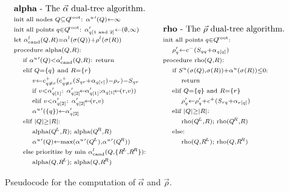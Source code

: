 \documentclass{article}
\newcommand{\kdroot}[1]{#1^{\!\text{\rm root}}}
\newcommand{\kdleft}[1]{#1^{\!L}}
\newcommand{\kdright}[1]{#1^{\!R}}
\newcommand{\X}{\\ \scriptstyle}
\newcommand{\x}{\\ \hspace{0.15in} \scriptstyle}
\newcommand{\xx}{\\ \hspace{0.3in} \scriptstyle}
\newcommand{\ocpos}[1]{c^{+}_{#1}}
\newcommand{\cpos}[2]{\ocpos{#1 \neq #2}}
\newcommand{\simil}[2]{S_{#1#2}}
\newcommand{\vecrho}{\vec{\rho}}
\newcommand{\vecalpha}{\vec{\alpha}}
\newcommand{\frho}[1]{\rho_{#1}}
\newcommand{\falphaj}[2]{\alpha_{#1[#2]}}
\newcommand{\falphamax}{\alpha^{u}}
\newcommand{\falphamin}{\alpha^{l}}
\newcommand{\frhomin}{\rho^{l}}
\newcommand{\alphacand}{v}
\begin{document}
\begin{figure}
  \begin{equation*}
    \begin{array}{ll}
      \begin{array}{l}
        \text{{\bf alpha} - The }\vecalpha\text{ dual-tree algorithm.}
        \X \text{init all nodes }Q \subseteq \kdroot{Q}\text{: }\falphamax{'}(Q) \gets \infty
        \X \text{init all points }q \in \kdroot{Q}\text{: }\falphaj{q}{1\text{ and }2}' \gets (\emptyset, \infty)
        \X \text{let }\falphamin_{\text{cand}}(Q, R) = \falphamin(\sigma(Q)) + \frhomin(\sigma(R))
        \X \text{procedure alpha}(Q,R)\text{:}
        \x \text{if }\falphamax{'}(Q) < \falphamin_{\text{cand}}(Q, R)\text{: return}
        \x \text{elif }Q = \{q\} \text{ and } R = \{r\}
        \xx \alphacand \gets \cpos{q}{r}(\cpos{q}{r}(\simil{q}{r} + \falphaj{q}{r}) - \frho{r}) - \simil{q}{r}
        \xx \text{if }\alphacand < \falphaj{q}{1}'\text{: } \falphaj{q}{2}' \!\gets\! \falphaj{q}{1}'; \falphaj{q}{1} \!\gets\! (r, \alphacand))
        \xx \text{elif }\alphacand < \falphaj{q}{2}'\text{: } \falphaj{q}{2}' \!\gets\! (r, \alphacand)
        \xx \falphamax{'}(\{q\}) \gets \falphaj{q}{2}'
        \x \text{elif }|Q| \geq |R|\text{:}
        \xx \text{alpha}(\kdleft{Q}, R); \text{ alpha}(\kdright{Q}, R)
        \xx \falphamax{'}(Q) \gets \max(\falphamax{'}(\kdleft{Q}), \falphamax{'}(\kdright{Q}))
        \x \text{else prioritize by min }\falphamin_{\text{cand}}(Q,\{\kdleft{R}, \kdright{R}\}){:}
        \xx \text{alpha}(Q, \kdleft{R}); \text{ alpha}(Q, \kdright{R})
      \end{array}
      &
      \begin{array}{l}
        \text{{\bf rho} - The }\vecrho\text{ dual-tree algorithm.}
        \X \text{init all points }q \in \kdroot{Q}\text{: }
        \x \frho{q}'\gets c^{-}(\simil{q}{q} + \falphaj{q}{q})
        \X \text{procedure rho}(Q,R)\text{:}
        \x \text{if }S^u(\sigma(Q),\sigma(R)) + \falphamax(\sigma(R)) \leq 0\text{:}
        \xx \text{return}
        \x \text{elif }Q = \{q\} \text{ and } R = \{r\}
        \xx \frho{q}' \gets \frho{q}' + c^{+}(\simil{r}{q} + \falphaj{r}{q})
        \x \text{elif }|Q| \geq |R|\text{:}
        \xx \text{rho}(\kdleft{Q}, R); \text{ rho}(\kdright{Q}, R)
        \x \text{else:}
        \xx \text{rho}(Q, \kdleft{R}); \text{ rho}(Q, \kdright{R})
      \end{array}
    \end{array}
    \vspace{-0.1in}
  \end{equation*}
  \caption{\label{fig:alpharho}Pseudocode for the computation of
  $\vecalpha$ and $\vecrho$.}
\end{figure}
\end{document}
